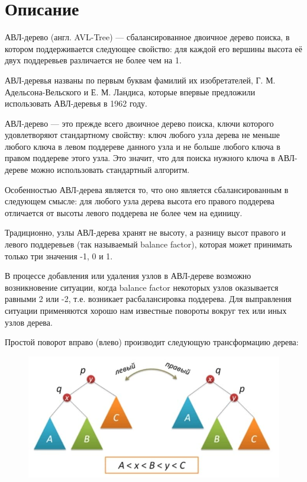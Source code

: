 \section{Описание}

АВЛ-дерево (англ. AVL-Tree) — сбалансированное двоичное дерево поиска, в котором поддерживается следующее свойство: для каждой его вершины высота её двух поддеревьев различается не более чем на 1.


АВЛ-деревья названы по первым буквам фамилий их изобретателей, Г. М. Адельсона-Вельского и Е. М. Ландиса, которые впервые предложили использовать АВЛ-деревья в 1962 году.


АВЛ-дерево — это прежде всего двоичное дерево поиска, ключи которого удовлетворяют стандартному свойству: ключ любого узла дерева не меньше любого ключа в левом поддереве данного узла и не больше любого ключа в правом поддереве этого узла. Это значит, что для поиска нужного ключа в АВЛ-дереве можно использовать стандартный алгоритм.


Особенностью АВЛ-дерева является то, что оно является сбалансированным в следующем смысле: для любого узла дерева высота его правого поддерева отличается от высоты левого поддерева не более чем на единицу.


Традиционно, узлы АВЛ-дерева хранят не высоту, а разницу высот правого и левого поддеревьев (так называемый balance factor), которая может принимать только три значения -1, 0 и 1.


В процессе добавления или удаления узлов в АВЛ-дереве возможно возникновение ситуации, когда balance factor некоторых узлов оказывается равными 2 или -2, т.е. возникает расбалансировка поддерева. Для выправления ситуации применяются хорошо нам известные повороты вокруг тех или иных узлов дерева.


Простой поворот вправо (влево) производит следующую трансформацию дерева:


\begin{figure}[!ht]
\begin{center}
\includegraphics[scale=0.5]{./images/0.jpg}\caption{}\label{figure1}
\end{center}
\end{figure}

